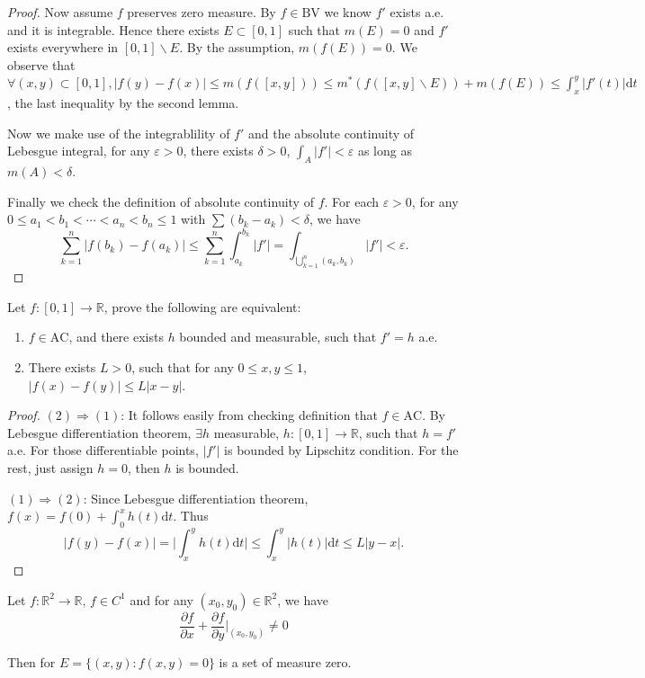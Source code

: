 \begin{proof}
	Now assume $ f $ preserves zero measure. By $ f\in\mathrm{BV}  $ we know $ f' $ exists a.e. and it is integrable. 
    Hence there exists $ E\subset [0,1] $ such that $ m(E)=0 $ and $ f' $ exists everywhere in $ [0,1]\backslash E $. 
    By the assumption, $ m(f(E))=0 $. We observe that $ \forall (x,y)\subset [0,1],|f(y)-f(x)|\le m(f([x,y]))\le m^{*}(f([x,y]\backslash E))+m(f(E))\le \int _{x}^{y}|f'(t)|\mathrm{d}t  $, the last inequality by the second lemma.
	
	Now we make use of the integrablility of $ f' $ and the absolute continuity of Lebesgue integral, for any $ \varepsilon>0 $, there exists $ \delta>0 $, $ \int _{A}|f'|<\varepsilon $ as long as $ m(A)<\delta $.
	
	Finally we check the definition of absolute continuity of $ f $. For each $ \varepsilon>0 $, for any $ 0\le a_{1}<b_{1}<\cdots <a_{n}<b_{n}\le 1 $ with $ \sum (b_{k}-a_{k}) <\delta $, we have
	$$
	\sum_{k=1}^{n}{|f( b_k ) -f( a_k ) |}\le \sum_{k=1}^{n}{\int_{a_k}^{b_k}{|f'|}}=\int_{\bigcup_{k=1}^{n} ( a_k,b_k )}^{}{|f'|}<\varepsilon.
	$$
\end{proof}

\begin{problem}
Let $ f\colon[0,1]\to \mathbb{R}  $, prove the following are equivalent:
\begin{enumerate}
\item $ f\in \mathrm{AC}  $, and there exists $ h $ bounded and measurable, such that $ f'=h $ a.e.
\item There exists $ L>0 $, such that for any $ 0\le x,y\le 1 $, $ |f(x)-f(y)|\le L|x-y| $.
\end{enumerate}
\end{problem}

\begin{proof}
	$ (2)\Rightarrow (1) $: It follows easily from checking definition that $ f\in\mathrm{AC}  $. By Lebesgue differentiation theorem, $ \exists h $ measurable, $ h\colon[0,1]\to \mathbb{R}  $, such that $ h=f' $ a.e. For those differentiable points, $ |f'| $ is bounded by Lipschitz condition. 
    For the rest, just assign $ h=0 $, then $ h $ is bounded.
	
	$ (1)\Rightarrow (2) $: Since Lebesgue differentiation theorem, $ f(x)=f(0)+\int _{0}^{x}h(t)\mathrm{d} t $. Thus
	$$
	|f( y ) -f( x ) |=\bigg|\int_x^y{h( t ) \mathrm{d} t}\bigg|\le \int_x^y |h( t ) |\mathrm{d} t \le L|y-x|.
	$$
\end{proof}

\begin{problem}
Let $ f\colon\mathbb{R} ^{2}\to \mathbb{R}  $, $ f\in C^{1} $ and for any $ (x_{0},y_{0})\in \mathbb{R} ^{2} $, we have
$$
\frac{\partial f}{\partial x}+\frac{\partial f}{\partial y}\big|_{\left( x_0,y_0 \right)}\ne 0
$$

Then for $ E=\{(x,y):f(x,y)=0\} $ is a set of measure zero.

\end{problem}

